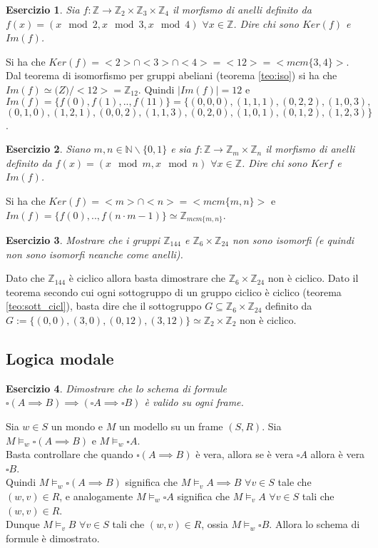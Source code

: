 \documentclass{article}
\theoremstyle{definition}
\theoremstyle{plain}
\theoremstyle{plain}
\theoremstyle{plain}
\theoremstyle{plain}
\newtheorem{esercizio}{Esercizio}
\begin{document}
\begin{esercizio}
    Sia $f : \mathbb{Z} \rightarrow \mathbb{Z}_2 \times \mathbb{Z}_3 \times \mathbb{Z}_4$ il morfismo di anelli definito da $f(x) = (x \mod 2, x \mod 3, x \mod 4)$ $\forall x \in \mathbb{Z}$. Dire chi sono $Ker(f)$ e $Im(f)$.
\end{esercizio}
Si ha che $Ker(f) = <2> \cap <3> \cap <4> = <12> = <mcm\{3, 4\}>$. Dal teorema di isomorfismo per gruppi abeliani (teorema \ref{teo:iso}) si ha che $Im(f) \simeq \mathbb(Z)/<12> = \mathbb{Z}_{12}$. Quindi $|Im(f)| = 12$ e $Im(f) = \{f(0), f(1), .., f(11)\} = \{(0, 0, 0), (1, 1, 1), (0, 2, 2), (1, 0, 3),$ $(0, 1, 0), (1, 2, 1), (0, 0, 2), (1, 1, 3), (0, 2, 0), (1, 0, 1), (0, 1, 2), (1, 2, 3)\}$.

\begin{esercizio}
    Siano $m, n \in \mathbb{N}\backslash\{0,1\}$ e sia $f : \mathbb{Z} \rightarrow \mathbb{Z}_m \times \mathbb{Z}_n$ il morfismo di anelli definito da $f(x) = (x \mod m, x \mod n)$ $\forall x \in \mathbb{Z}$. Dire chi sono $Ker{f}$ e $Im(f)$.
\end{esercizio}
Si ha che $Ker(f) = <m> \cap <n> = <mcm\{m, n\}>$ e $Im(f) = \{f(0), .., f(n\cdot m - 1)\} \simeq \mathbb{Z}_{mcm\{m, n\}}$. 

\begin{esercizio}
    Mostrare che i gruppi $\mathbb{Z}_{144}$ e $\mathbb{Z}_6 \times \mathbb{Z}_{24}$ non sono isomorfi (e quindi non sono isomorfi neanche come anelli).
\end{esercizio}
Dato che $\mathbb{Z}_{144}$ è ciclico allora basta dimostrare che $\mathbb{Z}_6 \times \mathbb{Z}_{24}$ non è ciclico. Dato il teorema secondo cui ogni sottogruppo di un gruppo ciclico è ciclico (teorema \ref{teo:sott_cicl}), basta dire che il sottogruppo $G \subseteq \mathbb{Z}_6 \times \mathbb{Z}_{24}$ definito da $G :=\{(0, 0), (3, 0), (0, 12), (3, 12)\} \simeq \mathbb{Z}_2 \times \mathbb{Z}_2$ non è ciclico.

\subsection*{Logica modale}
\begin{esercizio}
    Dimostrare che lo schema di formule $\square (A \implies B) \implies (\square A \implies \square B)$ è valido su ogni frame.    
\end{esercizio}
Sia $w \in S$ un mondo e $M$ un modello su un frame $(S, R)$. Sia $M \models_w \square(A \implies B)$ e $M \models_w \square A$. \\
Basta controllare che quando $\square (A \implies B)$ è vera, allora se è vera $\square A$ allora è vera $\square B$. \\
Quindi $M \models_w \square(A \implies B)$ significa che $M \models_v A \implies B$ $\forall v \in S$ tale che $(w, v) \in R$, e analogamente $M \models_w \square A$ significa che $M \models_v A$ $\forall v \in S$ tali che $(w, v) \in R$. \\
Dunque $M \models_v B$ $\forall v \in S$ tali che $(w, v) \in R$, ossia $M \models_w \square B$. Allora lo schema di formule è dimostrato.
\end{document}
